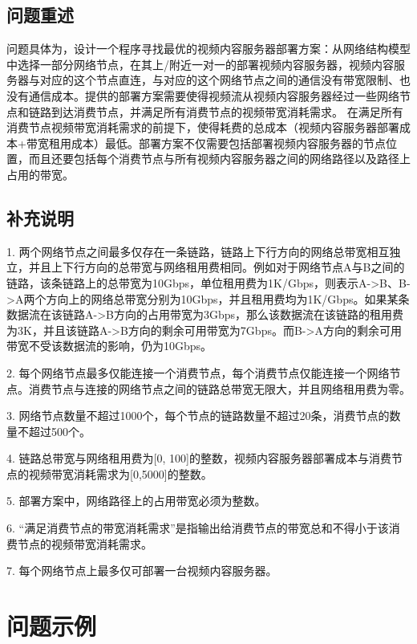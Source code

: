 \documentclass[a4paper,11pt,onecolumn,twoside]{article}
\begin{document}
\begin{multicols}{2}
\subsection{问题重述}

问题具体为，设计一个程序寻找最优的视频内容服务器部署方案：从网络结构模型中选择一部分网络节点，在其上/附近一对一的部署视频内容服务器，视频内容服务器与对应的这个节点直连，与对应的这个网络节点之间的通信没有带宽限制、也没有通信成本。提供的部署方案需要使得视频流从视频内容服务器经过一些网络节点和链路到达消费节点，并满足所有消费节点的视频带宽消耗需求。
在满足所有消费节点视频带宽消耗需求的前提下，使得耗费的总成本（视频内容服务器部署成本+带宽租用成本）最低。部署方案不仅需要包括部署视频内容服务器的节点位置，而且还要包括每个消费节点与所有视频内容服务器之间的网络路径以及路径上占用的带宽。

\subsection{补充说明}
1. 两个网络节点之间最多仅存在一条链路，链路上下行方向的网络总带宽相互独立，并且上下行方向的总带宽与网络租用费相同。例如对于网络节点A与B之间的链路，该条链路上的总带宽为10Gbps，单位租用费为1K/Gbps，则表示A->B、B->A两个方向上的网络总带宽分别为10Gbps，并且租用费均为1K/Gbps。如果某条数据流在该链路A->B方向的占用带宽为3Gbps，那么该数据流在该链路的租用费为3K，并且该链路A->B方向的剩余可用带宽为7Gbps。而B->A方向的剩余可用带宽不受该数据流的影响，仍为10Gbps。

2. 每个网络节点最多仅能连接一个消费节点，每个消费节点仅能连接一个网络节点。消费节点与连接的网络节点之间的链路总带宽无限大，并且网络租用费为零。

3. 网络节点数量不超过1000个，每个节点的链路数量不超过20条，消费节点的数量不超过500个。

4. 链路总带宽与网络租用费为[0, 100]的整数，视频内容服务器部署成本与消费节点的视频带宽消耗需求为[0,5000]的整数。

5. 部署方案中，网络路径上的占用带宽必须为整数。

6. “满足消费节点的带宽消耗需求”是指输出给消费节点的带宽总和不得小于该消费节点的视频带宽消耗需求。

7. 每个网络节点上最多仅可部署一台视频内容服务器。

\section{问题示例}


\end{multicols}
\end{document}
